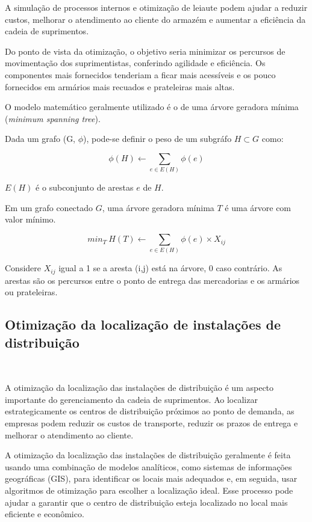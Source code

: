\documentclass{amsart}
\begin{document}
A simulação de processos internos e otimização de leiaute podem ajudar a reduzir custos, melhorar o atendimento ao cliente do armazém e aumentar a eficiência da cadeia de suprimentos.

Do ponto de vista da otimização, o objetivo seria minimizar os percursos de movimentação dos suprimentistas, conferindo agilidade e eficiência. Os componentes mais fornecidos tenderiam a ficar mais acessíveis e os pouco fornecidos em armários mais recuados e prateleiras mais altas.

O modelo matemático geralmente utilizado é o de uma árvore geradora mínima ({\it minimum spanning tree}).

Dada um grafo (G, $\phi$), pode-se definir o peso de um subgráfo $H \subset G$ como:

\begin{equation} \label{eq:fo1}
	\phi(H) \gets \sum_{e \in E(H)} \phi (e)
\end{equation}

$E(H)$ é o subconjunto de arestas $e$ de $H$.

Em um grafo conectado $G$, uma árvore geradora mínima $T$ é uma árvore com valor mínimo.

\begin{equation} \label{eq:fo2}
	min_T\ H(T) \gets \sum_{e \in E(H)} \phi (e) \times X_{ij}
\end{equation}


Considere $X_{ij}$ igual a 1 se a aresta (i,j) está na árvore, 0 caso contrário. As arestas são os percursos entre o ponto de entrega das mercadorias e os armários ou prateleiras.



\subsection{Otimização da localização de instalações de distribuição}\

A otimização da localização das instalações de distribuição é um aspecto importante do gerenciamento da cadeia de suprimentos. Ao localizar estrategicamente os centros de distribuição próximos ao ponto de demanda, as empresas podem reduzir os custos de transporte, reduzir os prazos de entrega e melhorar o atendimento ao cliente.

A otimização da localização das instalações de distribuição geralmente é feita usando uma combinação de modelos analíticos, como sistemas de informações geográficas (GIS), para identificar os locais mais adequados e, em seguida, usar algoritmos de otimização para escolher a localização ideal. Esse processo pode ajudar a garantir que o centro de distribuição esteja localizado no local mais eficiente e econômico.
\end{document}
